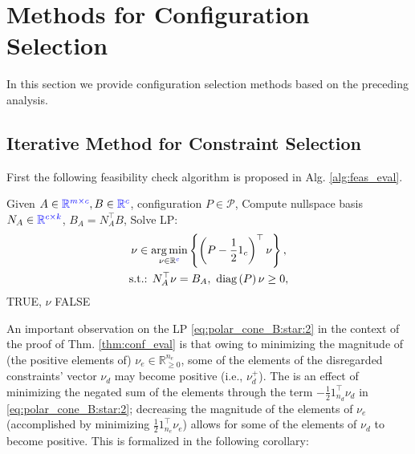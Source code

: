 \documentclass[letterpaper, 10 pt, conference]{ieeeconf}  %
\begin{document}
\section{Methods for Configuration Selection}\label{sec:conf_selec_methods}
In this section we provide configuration selection methods based on the preceding analysis.
{\color{blue}
\subsection{Iterative Method for Constraint Selection}
}
First the following feasibility check algorithm is proposed in Alg. \ref{alg:feas_eval}.
\begin{algorithm}
\caption{Feasibility Check: {\selectfont FC}$(A,B,P)$}\label{alg:feas_eval}
\begin{algorithmic}[1]
\State  Given $A\in{\color{blue}\mathbb{R}^{m\times c}},B\in{\color{blue}\mathbb{R}^{c}}$, configuration $P\in\mathcal{P}$,
\State  Compute nullspace basis $N_A\in{\color{blue}\mathbb{R}^{c\times k}}$, $B_A= N_A^\top B$,
\State  Solve LP:
\begin{equation}\label{eq:fc:alg}
    \begin{gathered}
    \nu \in \underset{\nu\in\mathbb{R}{\color{blue}^c}}{\arg\min}\left\{\left( P - \frac{1}{2}{1}_c \right)^\top \nu \right\}, \\
    \textrm{s.t.: } N_{A}^\top \nu = B_{A}, \ \textrm{diag}\left( P\right) \nu \geq 0,
    \end{gathered}   
\end{equation}
    \State \Return TRUE, $\nu$
    \State \Return FALSE
\EndIf
\end{algorithmic}
\end{algorithm}
\par 
An important observation on the LP \eqref{eq:polar_cone_B:star:2} in the context of the proof of Thm. \ref{thm:conf_eval} is that owing to minimizing the magnitude of (the positive elements of) $\nu_e\in\mathbb{R}^{n_e}_{\geq 0}$, some of the elements of the disregarded constraints' vector $\nu_d$ may become positive (i.e., $\nu_d^+ $). The is an effect of minimizing the negated sum of the elements through the term $- \frac{1}{2}{1}_{n_d}^\top \nu_d$ in \eqref{eq:polar_cone_B:star:2}; decreasing the magnitude of the elements of $\nu_e$ (accomplished by minimizing $\frac{1}{2}{1}_{n_e}^\top \nu_e$) allows for some of the elements of $\nu_d$ to become positive. This is formalized in the following corollary:
\end{document}
